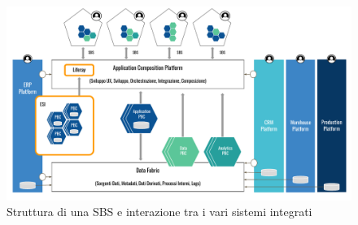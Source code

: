 \begin{figure}
    \centering
    \includegraphics[width=\linewidth]{figures/struttura-sbs.pdf}
    \caption{Struttura di una SBS e interazione tra i vari sistemi integrati}
    \label{fig:sbs}
\end{figure}

